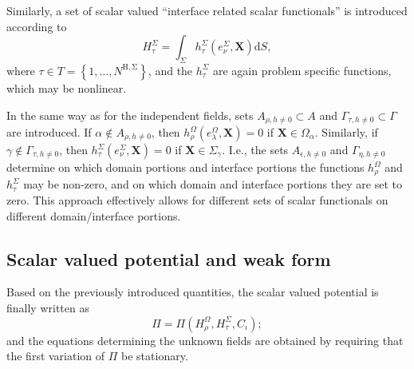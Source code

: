 \documentclass[pdftex,a4paper,12pt,abstracton]{scrartcl}
\begin{document}
Similarly, a set of scalar valued ``interface related scalar functionals'' is introduced according to
\begin{equation}
H^\Sigma_\tau = \int_\Sigma h^\Sigma_\tau(e^\Sigma_\nu, \boldsymbol{X}) \mathrm{d}S,
\end{equation}
where $\tau \in T=\left\{1, \hdots, N^\mathrm{H,\Sigma}\right\}$, and the $h^\Sigma_\tau$ are again problem specific functions, which may be nonlinear.

In the same way as for the independent fields, sets $A_{\rho,h\neq 0} \subset A$ and $\Gamma_{\tau,h\neq 0} \subset \Gamma$ are introduced. If $\alpha \notin A_{\rho,h\neq 0}$, then $h^\Omega_\rho(e^\Omega_\lambda, \boldsymbol{X})=0$ if $\boldsymbol{X} \in \Omega_\alpha$. Similarly, if
$\gamma \notin \Gamma_{\tau,h\neq  0}$, then $h^\Sigma_\tau(e^\Sigma_\nu, \boldsymbol{X})=0$ if $\boldsymbol{X} \in \Sigma_\gamma$. I.e., the sets $A_{\epsilon,h\neq 0}$ and $\Gamma_{\eta,h\neq 0}$ determine on which domain portions and interface portions the functions $h^\Omega_\rho$ and $h^\Sigma_\tau$ may be non-zero, and on which domain and interface portions they are set to zero. This approach effectively allows for different sets of scalar functionals on different domain/interface portions.

\subsection{Scalar valued potential and weak form}
Based on the previously introduced quantities, the scalar valued potential is finally written as
\begin{equation}
\Pi=\Pi(H^\Omega_\rho, H^\Sigma_\tau, C_\iota);
\label{Pi}
\end{equation}
and the equations determining the unknown fields are obtained by requiring that the first variation of $\Pi$ be stationary.
\end{document}
